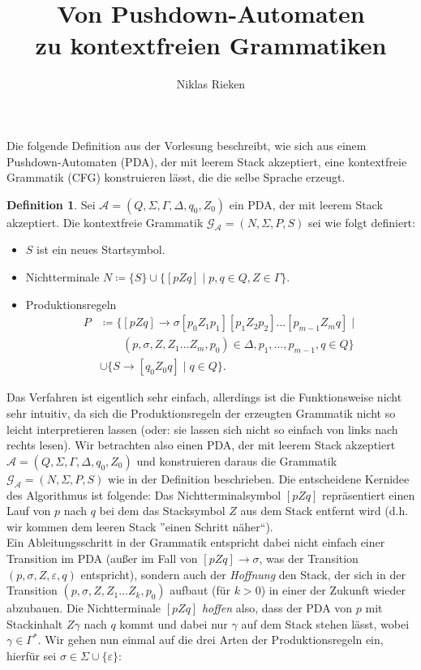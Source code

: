 \documentclass[11pt, a4paper]{article}
\author{Niklas Rieken}
\title{Von Pushdown-Automaten\\zu kontextfreien Grammatiken}
\theoremstyle{definition}
\newtheorem*{definition*}{Definition}
\theoremstyle{plain}
\begin{document}
\maketitle
Die folgende Definition aus der Vorlesung beschreibt, wie sich aus einem Pushdown-Automaten (PDA), der mit leerem Stack akzeptiert, eine kontextfreie Grammatik (CFG) konstruieren lässt, die die selbe Sprache erzeugt. 
\begin{definition*}
	Sei $\mathcal{A} = (Q, \Sigma, \Gamma, \Delta, q_0, Z_0)$ ein PDA, der mit leerem Stack akzeptiert. Die kontextfreie Grammatik $\mathcal{G}_\mathcal{A} = (N, \Sigma, P, S)$ sei wie folgt definiert:
	\begin{itemize}
		\item $S$ ist ein neues Startsymbol.
		\item Nichtterminale $N \coloneqq \{S\} \cup \{[pZq] \mid p, q\in Q, Z \in \Gamma\}$.
		\item Produktionsregeln
			\begin{align*}
				P &\coloneqq \{[pZq] \to \sigma [p_0Z_1p_1][p_1Z_2p_2]\ldots[p_{m-1}Z_mq] \mid\\
				&\quad\quad (p, \sigma, Z, Z_1 \ldots Z_m, p_0) \in \Delta, p_1, \ldots, p_{m-1}, q \in Q\}\\
				&\cup \{S \to [q_0Z_0q] \mid q \in Q\}.
			\end{align*}
	\end{itemize}
\end{definition*}
Das Verfahren ist eigentlich sehr einfach, allerdings ist die Funktionsweise nicht sehr intuitiv, da sich die Produktionsregeln der erzeugten Grammatik nicht so leicht interpretieren lassen (oder: sie lassen sich nicht so einfach von links nach rechts lesen).
Wir betrachten also einen PDA, der mit leerem Stack akzeptiert $\mathcal{A} = (Q, \Sigma, \Gamma, \Delta, q_0, Z_0)$ und konstruieren daraus die Grammatik $\mathcal{G_A} = (N, \Sigma, P, S)$ wie in der Definition beschrieben. Die entscheidene Kernidee des Algorithmus ist folgende: Das Nichtterminalsymbol $[pZq]$ repräsentiert einen Lauf von $p$ nach $q$ bei dem das Stacksymbol $Z$ aus dem Stack entfernt wird (d.h. wir kommen dem leeren Stack ''einen Schritt näher``).\\
Ein Ableitungsschritt in der Grammatik entspricht dabei nicht einfach einer Transition im PDA (außer im Fall von $[pZq] \to \sigma$, was der Transition $(p, \sigma, Z, \varepsilon, q)$ entspricht), sondern auch der \textit{Hoffnung} den Stack, der sich in der Transition $(p, \sigma, Z, Z_1 \ldots Z_k, p_0)$ aufbaut (für $k > 0$) in einer der Zukunft wieder abzubauen. Die Nichtterminale $[pZq]$ \textit{hoffen} also, dass der PDA von $p$ mit Stackinhalt $Z\gamma$ nach $q$ kommt und dabei nur $\gamma$ auf dem Stack stehen lässt, wobei $\gamma \in \Gamma^\ast$. Wir gehen nun einmal auf die drei Arten der Produktionsregeln ein, hierfür sei $\sigma \in \Sigma \cup \{ \varepsilon \}$:
\end{document}
